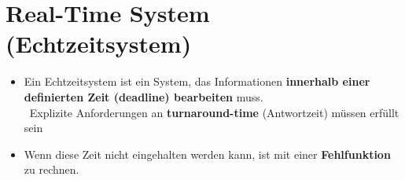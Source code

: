 \section{Real-Time System (Echtzeitsystem)}



\begin{itemize}
    \item Ein Echtzeitsystem ist ein System, das Informationen \textbf{innerhalb einer definierten Zeit (deadline) bearbeiten} muss. \\
        \textrightarrow\ Explizite Anforderungen an \textbf{turnaround-time} (Antwortzeit) müssen erfüllt sein
    \item Wenn diese Zeit nicht eingehalten werden kann, ist mit einer \textbf{Fehlfunktion} zu rechnen.
\end{itemize}

\vspace{0.2cm}


